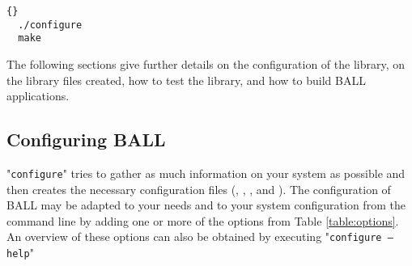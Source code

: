 \begin{lstlisting}{}
  ./configure
  make
\end{lstlisting}

The following sections give further details on the configuration of the library,
on the library files created, how to test the library, and how to build BALL 
applications.

\subsection{Configuring BALL}

"{\tt configure}" tries to gather as much information on your system as possible and 
then creates the necessary configuration files (,
, , and ).
The configuration of BALL may be adapted to your needs and to your system
configuration from the command line by adding one or more of the options from
Table \ref{table:options}.
An overview of these options can also be obtained by executing "{\tt configure
--help}"

